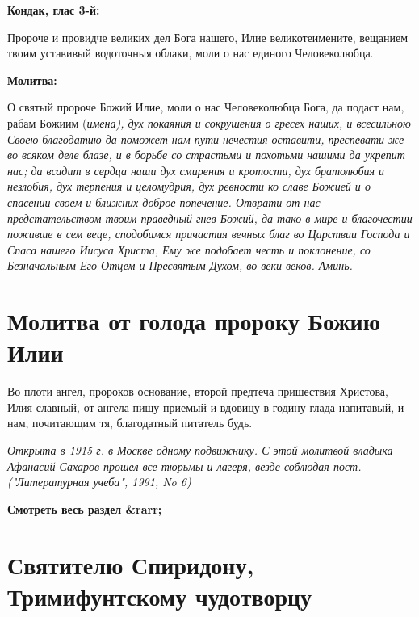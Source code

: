 \medskip


\bfseries Кондак, глас 3-й:\normalfont{}


Пророче и провидче великих дел Бога нашего, Илие великотеимените, вещанием твоим уставивый водоточныя облаки, моли о нас единого Человеколюбца.


\medskip


\bfseries Молитва:\normalfont{}


О святый пророче Божий Илие, моли о нас Человеколюбца Бога, да подаст нам, рабам Божиим (\itshape имена\normalfont{}), дух покаяния и сокрушения о гресех наших, и всесильною Своею благодатию да поможет нам пути нечестия оставити, преспевати же во всяком деле блазе, и в борьбе со страстьми и похотьми нашими да укрепит нас; да всадит в сердца наши дух смирения и кротости, дух братолюбия и незлобия, дух терпения и целомудрия, дух ревности ко славе Божией и о спасении своем и ближних доброе попечение. Отврати от нас предстательством твоим праведный гнев Божий, да тако в мире и благочестии поживше в сем веце, сподобимся причастия вечных благ во Царствии Господа и Спаса нашего Иисуса Христа, Ему же подобает честь и поклонение, со Безначальным Его Отцем и Пресвятым Духом, во веки веков. Аминь.


\section{Молитва от голода пророку Божию Илии}
 



Во плоти ангел, пророков основание, второй предтеча пришествия Христова, Илия славный, от ангела пищу приемый и вдовицу в годину глада напитавый, и нам, почитающим тя, благодатный питатель будь.


\itshape Открыта в 1915 г. в Москве одному подвижнику. С этой молитвой владыка Афанасий Сахаров прошел все тюрьмы и лагеря, везде соблюдая пост. ("Литературная учеба", 1991, No 6)\normalfont{}


\mychapterending


\bfseries Смотреть весь раздел &rarr;\normalfont{} 

\section{Святителю Спиридону, Тримифунтскому чудотворцу}
 


